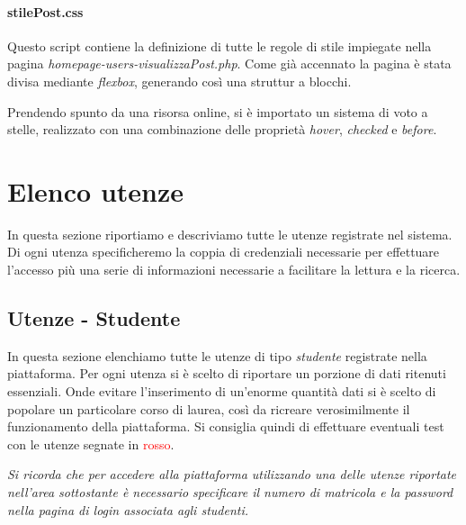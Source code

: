 \documentclass [a4paper,11pt]{book}
\begin{document}
\subsubsection{stilePost.css}

Questo script contiene la definizione di tutte le regole di stile impiegate nella pagina \emph{homepage-users-visualizzaPost.php}.
Come già accennato la pagina è stata divisa mediante \emph{flexbox}, generando così una struttur a blocchi.

Prendendo spunto da una risorsa online, si è importato un sistema di voto a stelle, realizzato con una combinazione delle proprietà \emph{hover}, \emph{checked} e \emph{before}.
\medskip

\chapter{Elenco utenze}

\medskip

In questa sezione riportiamo e descriviamo tutte le utenze registrate nel sistema. Di ogni utenza specificheremo la coppia di credenziali necessarie per effettuare l'accesso più una serie di informazioni necessarie a facilitare la lettura e la ricerca.

\section{Utenze - Studente}

In questa sezione elenchiamo tutte le utenze di tipo \emph{studente} registrate nella piattaforma. Per ogni utenza si è scelto di riportare un porzione di dati ritenuti essenziali. Onde evitare l'inserimento di un'enorme quantità dati si è scelto di popolare un particolare corso di laurea, così da ricreare verosimilmente il funzionamento della piattaforma. Si consiglia quindi di effettuare eventuali test con le utenze segnate in \textcolor{red}{rosso}. 

\medskip

\emph{Si ricorda che per accedere alla piattaforma utilizzando una delle utenze riportate nell'area sottostante è necessario specificare il numero di matricola e la password nella pagina di login associata agli studenti.}
\end{document}
